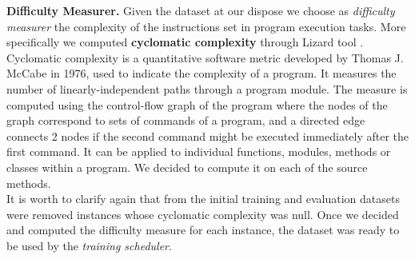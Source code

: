

\noindent\textbf{Difficulty Measurer.} Given the dataset at our dispose we choose as \textit{difficulty measurer} the 
complexity of the instructions set in program execution tasks. More specifically we 
computed \textbf{cyclomatic complexity} through Lizard tool \cite{lizard}. Cyclomatic complexity
is a quantitative software metric developed by Thomas J. McCabe in 1976, used to indicate
the complexity of a program.  
It measures the number of linearly-independent paths through a program module. 
The measure is computed using the control-flow graph of the program where
the nodes of the graph correspond to sets of commands of a program, and
a directed edge connects 2 nodes if the second command might be executed
immediately after the first command. It can be applied to individual functions,
modules, methods or classes within a program. We decided to compute it on each of
the source methods.\\
It is worth to clarify again that from the initial training and evaluation datasets were removed instances whose
cyclomatic complexity was null. Once we decided and computed the difficulty measure
for each instance, the dataset was ready to be used by the \textit{training scheduler}.\newline

